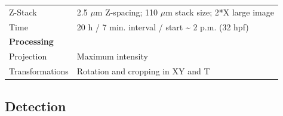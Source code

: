\documentclass[11pt,singlespacinge,twoside]{reedthesis} %
\begin{document}
\begin{longtable}[]{@{}ll@{}}
\begin{minipage}[t]{0.21\columnwidth}
Z-Stack\strut
\end{minipage} & \begin{minipage}[t]{0.73\columnwidth}\raggedright
2.5 \(\mu\)m Z-spacing; 110 \(\mu\)m stack size; 2*X large image\strut
\end{minipage}\tabularnewline
\begin{minipage}[t]{0.21\columnwidth}\raggedright
Time\strut
\end{minipage} & \begin{minipage}[t]{0.73\columnwidth}\raggedright
20 h / 7 min. interval / start \textasciitilde{} 2 p.m. (32 hpf)\strut
\end{minipage}\tabularnewline
\begin{minipage}[t]{0.21\columnwidth}\raggedright
\textbf{Processing}\strut
\end{minipage} & \begin{minipage}[t]{0.73\columnwidth}\raggedright
\strut
\end{minipage}\tabularnewline
\begin{minipage}[t]{0.21\columnwidth}\raggedright
Projection\strut
\end{minipage} & \begin{minipage}[t]{0.73\columnwidth}\raggedright
Maximum intensity\strut
\end{minipage}\tabularnewline
\begin{minipage}[t]{0.21\columnwidth}\raggedright
Transformations\strut
\end{minipage} & \begin{minipage}[t]{0.73\columnwidth}\raggedright
Rotation and cropping in XY and T\strut
\end{minipage}\tabularnewline
\bottomrule
\end{longtable}
\hypertarget{detect-data}{%
\subsection{Detection}\label{detect-data}}
\end{document}
